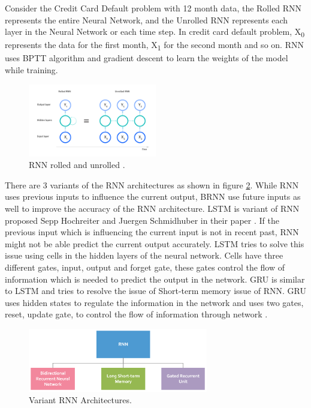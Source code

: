 \documentclass[twoside,11pt,a4paper]{article}
\begin{document}
Consider the Credit Card Default problem with 12 month data, the Rolled \acs{RNN} represents the entire Neural Network, and the Unrolled \acs{RNN} represents each layer in the Neural Network or each time step. In credit card default problem, X\textsubscript{0}  represents the data for the first month, X\textsubscript{1} for the second month and so on. \acs{RNN} uses \acf{BPTT} algorithm and gradient descent to learn the weights of the model while training.
\begin{figure}[ht]
	\centering
	\includegraphics[width=0.5\textwidth]{rnn_rolled_unrolled}
	\caption[\acs{RNN} rolled and unrolled]{\acs{RNN} rolled and unrolled \citep{ibm2022rnn}.}
	\label{fig:rnn_rolled_unrolled}
\end{figure}


There are 3 variants of the \acs{RNN} architectures as shown in figure \ref{fig:various_rnn}. While \acs{RNN} uses previous inputs to influence the current output, \acs{BRNN} use future inputs as well to improve the accuracy of the \acs{RNN} architecture. \acf{LSTM} is variant of \acs{RNN} proposed Sepp Hochreiter and Juergen Schmidhuber in their paper \citep{hochreiter1997long}. If the previous input which is influencing the current input is not in recent past, \acs{RNN} might not be able predict the current output accurately. \acs{LSTM} tries to solve this issue using cells in the hidden layers of the neural network. Cells have three different gates, input, output and forget gate, these gates control the flow of information which is needed to predict the output in the network. \acf{GRU} is similar to \acs{LSTM} and tries to resolve the issue of Short-term memory issue of \acs{RNN}. \acs{GRU} uses hidden states to regulate the information in the network and uses two gates, reset, update gate, to control the flow of information through network \citep{cho2014learning}.\\
\begin{figure}[ht]
	\centering
	\includegraphics[width=0.7\textwidth]{various_rnn}
	\caption[Variant \acs{RNN} Architectures]{Variant \acs{RNN} Architectures.}
	\label{fig:various_rnn}
\end{figure}
\end{document}
